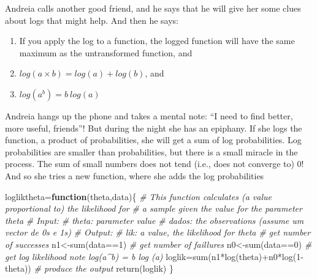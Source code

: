 \documentclass[
]{book}
\newenvironment{Shaded}{\begin{snugshade}}{\end{snugshade}}
\newcommand{\CommentTok}[1]{\textcolor[rgb]{0.56,0.35,0.01}{\textit{#1}}}
\newcommand{\ControlFlowTok}[1]{\textcolor[rgb]{0.13,0.29,0.53}{\textbf{#1}}}
\newcommand{\DecValTok}[1]{\textcolor[rgb]{0.00,0.00,0.81}{#1}}
\newcommand{\FunctionTok}[1]{\textcolor[rgb]{0.00,0.00,0.00}{#1}}
\newcommand{\NormalTok}[1]{#1}
\newcommand{\OtherTok}[1]{\textcolor[rgb]{0.56,0.35,0.01}{#1}}
\newcommand{\SpecialCharTok}[1]{\textcolor[rgb]{0.00,0.00,0.00}{#1}}
\begin{document}
Andreia calls another good friend, and he says that he will give her some clues about logs that might help. And then he says:

\begin{enumerate}
\def\labelenumi{\arabic{enumi}.}
\item
  If you apply the log to a function, the logged function will have the same maximum as the untransformed function, and
\item
  \(log(a \times b) = log(a)+log(b)\), and
\item
  \(log(a^b) = b~log (a)\)
\end{enumerate}

Andreia hangs up the phone and takes a mental note: ``I need to find better, more useful, friends''! But during the night she has an epiphany. If she logs the function, a product of probabilities, she will get a sum of log probabilities. Log probabilities are smaller than probabilities, but there is a small miracle in the process. The sum of small numbers does not tend (i.e., does not converge to) 0! And so she tries a new function, where she adds the log probabilities

\begin{Shaded}
\begin{Highlighting}[]
\NormalTok{logliktheta}\OtherTok{=}\ControlFlowTok{function}\NormalTok{(theta,data)\{}
  \CommentTok{\# This function calculates (a value proportional to) the likelihood for }
  \CommentTok{\# a sample given the value for the parameter theta }
  \CommentTok{\# Input:}
  \CommentTok{\#       theta: parameter value}
  \CommentTok{\#       dados: the observations (assume um vector de 0\textquotesingle{}s e 1\textquotesingle{}s)}
  \CommentTok{\# Output:}
  \CommentTok{\#       lik: a value, the likelihood for theta}
  \CommentTok{\# get number of successes}
\NormalTok{  n1}\OtherTok{\textless{}{-}}\FunctionTok{sum}\NormalTok{(data}\SpecialCharTok{==}\DecValTok{1}\NormalTok{)}
  \CommentTok{\# get number of faillures}
\NormalTok{  n0}\OtherTok{\textless{}{-}}\FunctionTok{sum}\NormalTok{(data}\SpecialCharTok{==}\DecValTok{0}\NormalTok{)}
  \CommentTok{\# get log likelihood note log(a\^{}b) = b log (a)}
\NormalTok{  loglik}\OtherTok{=}\FunctionTok{sum}\NormalTok{(n1}\SpecialCharTok{*}\FunctionTok{log}\NormalTok{(theta)}\SpecialCharTok{+}\NormalTok{n0}\SpecialCharTok{*}\FunctionTok{log}\NormalTok{(}\DecValTok{1}\SpecialCharTok{{-}}\NormalTok{theta))}
  \CommentTok{\# produce the output}
  \FunctionTok{return}\NormalTok{(loglik)}
\NormalTok{  \}}
\end{Highlighting}
\end{Shaded}
\end{document}
